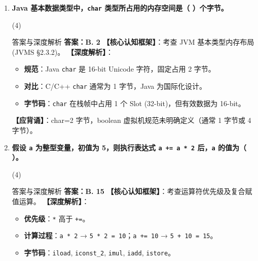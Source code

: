 ﻿\documentclass[12pt, a4paper]{ctexart}
\newcommand{\code}[1]{\texttt{#1}}
\begin{document}
\begin{enumerate}[label=\textbf{\arabic*.}, leftmargin=*, itemsep=1.5em]
\begin{bluebox}{答案与深度解析}
		      \textbf{【应背诵知识点（命题人思维版）】}
		      \begin{itemize}[leftmargin=*, nosep]
			      \item 标识符组成：字母、数字、\_、\$
			      \item 限制：数字不能开头，不能是关键字
		      \end{itemize}
	      \end{bluebox}

	\item \textbf{Java 基本数据类型中，\code{char} 类型所占用的内存空间是（ \quad ）个字节。}
	      \begin{tasks}(4)
		         
	      \end{tasks}
	      \begin{bluebox}{答案与深度解析}
		      \textbf{答案：B. 2}
		      \textbf{【核心认知框架】}：考查 JVM 基本类型内存布局 (JVMS §2.3.2)。
		      \textbf{【深度解析】}：
		      \begin{itemize}[leftmargin=*, nosep]
			      \item \textbf{规范}：Java \code{char} 是 16-bit Unicode 字符，固定占用 2 字节。
			      \item \textbf{对比}：C/C++ \code{char} 通常为 1 字节，Java 为国际化设计。
			      \item \textbf{字节码}：\code{char} 在栈帧中占用 1 个 Slot (32-bit)，但有效数据为 16-bit。
		      \end{itemize}
		      \textbf{【应背诵】}：char=2 字节，boolean 虚拟机规范未明确定义（通常 1 字节或 4 字节）。
	      \end{bluebox}

	\item \textbf{假设 \code{a} 为整型变量，初值为 5，则执行表达式 \code{a += a * 2} 后，\code{a} 的值为（ \quad ）。}
	      \begin{tasks}(4)
		         
	      \end{tasks}
	      \begin{bluebox}{答案与深度解析}
		      \textbf{答案：B. 15}
		      \textbf{【核心认知框架】}：考查运算符优先级及复合赋值运算。
		      \textbf{【深度解析】}：
		      \begin{itemize}[leftmargin=*, nosep]
			      \item \textbf{优先级}：\code{*} 高于 \code{+=}。
			      \item \textbf{计算过程}：\code{a * 2} → \code{5 * 2 = 10}；\code{a += 10} → \code{5 + 10 = 15}。
			      \item \textbf{字节码}：\code{iload}, \code{iconst\_2}, \code{imul}, \code{iadd}, \code{istore}。
		      \end{itemize}
	      \end{bluebox}


\end{enumerate}
\end{document}
